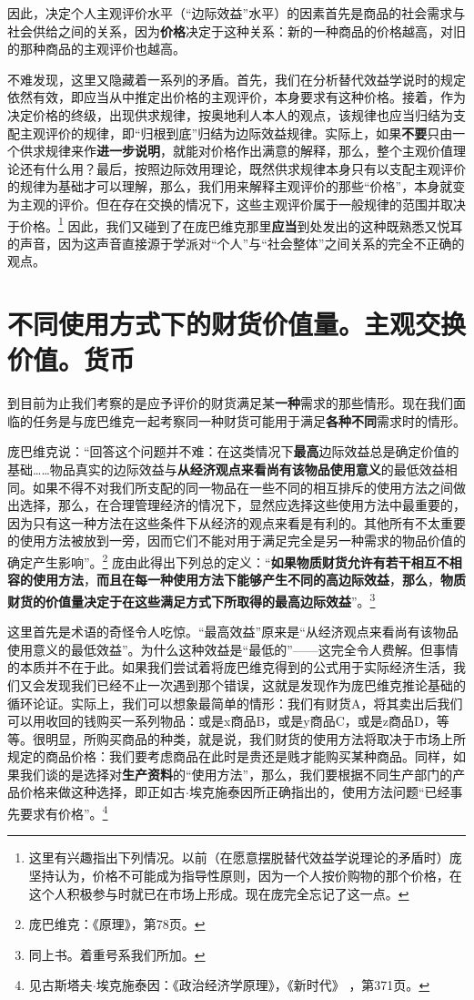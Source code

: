 \documentclass[fontset=fandol, a4paper, 12pt, openright]{ctexbook}
\newcommand{\RN}[1]{%
  \textup{\uppercase\expandafter{\romannumeral#1}}%
}
\begin{document}
因此，决定个人主观评价水平（“边际效益”水平）的因素首先是商品的社会需求与社会供给之间的关系，因为\textbf{价格}决定于这种关系：新的一种商品的价格越高，对旧的那种商品的主观评价也越高。

不难发现，这里又隐藏着一系列的矛盾。首先，我们在分析替代效益学说时的规定依然有效，即应当从中推定出价格的主观评价，本身要求有这种价格。接着，作为决定价格的终级，出现供求规律，按奥地利人本人的观点，该规律也应当归结为支配主观评价的规律，即“归根到底”归结为边际效益规律。实际上，如果\textbf{不要}只由一个供求规律来作\textbf{进一步说明}，就能对价格作出满意的解释，那么，整个主观价值理论还有什么用？最后，按照边际效用理论，既然供求规律本身只有以支配主观评价的规律为基础才可以理解，那么，我们用来解释主观评价的那些“价格”，本身就变为主观的评价。但在存在交换的情况下，这些主观评价属于一般规律的范围并取决于价格。\footnote{这里有兴趣指出下列情况。以前（在愿意摆脱替代效益学说理论的矛盾时）庞坚持认为，价格不可能成为指导性原则，因为一个人按价购物的那个价格，在这个人积极参与时就已在市场上形成。现在庞完全忘记了这一点。} 因此，我们又碰到了在庞巴维克那里\textbf{应当}到处发出的这种既熟悉又悦耳的声音，因为这声音直接源于学派对“个人”与“社会整体”之间关系的完全不正确的观点。

\section{不同使用方式下的财货价值量。主观交换价值。货币}

到目前为止我们考察的是应予评价的财货满足某\textbf{一种}需求的那些情形。现在我们面临的任务是与庞巴维克一起考察同一种财货可能用于满足\textbf{各种不同}需求时的情形。

庞巴维克说：“回答这个问题并不难：在这类情况下\textbf{最高}边际效益总是确定价值的基础……物品真实的边际效益与\textbf{从经济观点来看尚有该物品使用意义}的最低效益相同。如果不得不对我们所支配的同一物品在一些不同的相互排斥的使用方法之间做出选择，那么，在合理管理经济的情况下，显然应选择这些使用方法中最重要的，因为只有这一种方法在这些条件下从经济的观点来看是有利的。其他所有不太重要的使用方法被放到一旁，因而它们不能对用于满足完全是另一种需求的物品价值的确定产生影响”。\footnote{庞巴维克：《原理》，第78页。} 庞由此得出下列总的定义：“\textbf{如果物质财货允许有若干相互不相容的使用方法}，\textbf{而且在每一种使用方法下能够产生不同的高边际效益}，\textbf{那么}，\textbf{物质财货的价值量决定于在这些满足方式下所取得的最高边际效益}”。\footnote{同上书。着重号系我们所加。}

这里首先是术语的奇怪令人吃惊。“最高效益”原来是“从经济观点来看尚有该物品使用意义的最低效益”。为什么这种效益是“最低的”——这完全令人费解。但事情的本质并不在于此。如果我们尝试着将庞巴维克得到的公式用于实际经济生活，我们又会发现我们已经不止一次遇到那个错误，这就是发现作为庞巴维克推论基础的循环论证。实际上，我们可以想象最简单的情形：我们有财货A，将其卖出后我们可以用收回的钱购买一系列物品：或是x商品B，或是y商品C，或是z商品D，等等。很明显，所购买商品的种类，就是说，我们财货的使用方法将取决于市场上所规定的商品价格：我们要考虑商品在此时是贵还是贱才能购买某种商品。同样，如果我们谈的是选择对\textbf{生产资料}的“使用方法”，那么，我们要根据不同生产部门的产品价格来做这种选择，即正如古$\cdot$埃克施泰因所正确指出的，使用方法问题“已经事先要求有价格”。\footnote{见古斯塔夫$\cdot$埃克施泰因：《政治经济学原理》，《新时代》\RN{28}，第371页。}
\end{document}
